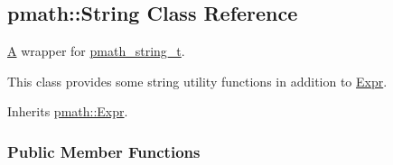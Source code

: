 \hypertarget{classpmath_1_1_string}{
\subsection{pmath::String Class Reference}
\label{classpmath_1_1_string}
}
\hyperlink{class_a}{A} wrapper for \hyperlink{classpmath__string__t}{pmath\_\-string\_\-t}.

This class provides some string utility functions in addition to \hyperlink{classpmath_1_1_expr}{Expr}.  


Inherits \hyperlink{classpmath_1_1_expr}{pmath::Expr}.

\subsubsection*{Public Member Functions}
